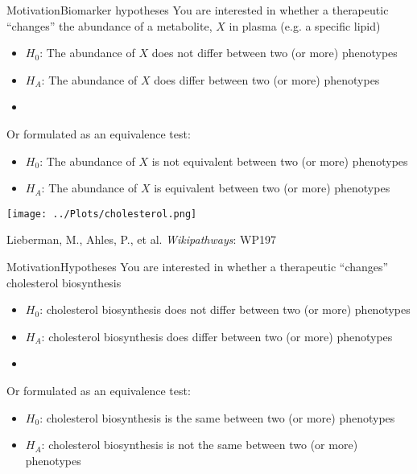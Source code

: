 \documentclass[xcolor=dvipsnames]{beamer}
\begin{document}
\begin{frame}{Motivation}{Biomarker hypotheses}
	\vspace{-10pt}
	You are interested in whether a therapeutic ``changes'' the abundance of a metabolite, $X$ in plasma (e.g. a specific lipid) \pause
	\begin{itemize}
		\item $H_0$: The abundance of $X$ does not differ between two (or more) phenotypes \pause
		\item $H_A$: The abundance of $X$ does differ between two (or more) phenotypes 
		\item[]
	\end{itemize} \pause
	
	Or formulated as an equivalence test:
	\begin{itemize}
		\item $H_0$: The abundance of $X$ is not equivalent between two (or more) phenotypes  
		\item $H_A$: The abundance of $X$ is equivalent between two (or more) phenotypes  
	\end{itemize}
\end{frame}

\begin{frame}
	\begin{center}
			\texttt{[image: ../Plots/cholesterol.png]}
			
			Lieberman, M., Ahles, P., et al. \emph{Wikipathways}: WP197
	\end{center}
\end{frame}

\begin{frame}{Motivation}{Hypotheses}
	\vspace{-10pt}
	You are interested in whether a therapeutic ``changes'' cholesterol biosynthesis \pause
	\begin{itemize}
		\item $H_0$: cholesterol biosynthesis does not differ between two (or more) phenotypes 
		\item $H_A$: cholesterol biosynthesis does differ between two (or more) phenotypes \pause
		\item[]
	\end{itemize} 
	
	Or formulated as an equivalence test:
	\begin{itemize}
		\item $H_0$: cholesterol biosynthesis is the same between two (or more) phenotypes 
		\item $H_A$: cholesterol biosynthesis is not the same between two (or more) phenotypes
	\end{itemize}
\end{frame}
\end{document}
